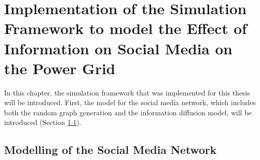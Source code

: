 \chapter{Implementation of the Simulation Framework to model the Effect
of Information on Social Media on the Power Grid}

In this chapter, the simulation framework that was implemented for this thesis
will be introduced.
First, the model for the social media network, which includes both the 
random graph generation and the information diffusion model, will be introduced
(Section \ref{socialmediasection}).

\section{Modelling of the Social Media Network}
\label{socialmediasection}




